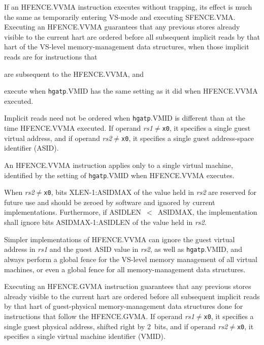 If an HFENCE.VVMA instruction executes without trapping, its effect is much the
same as temporarily entering VS-mode and executing SFENCE.VMA.
Executing an HFENCE.VVMA guarantees that any previous stores already visible
to the current hart are ordered before all subsequent implicit reads by that
hart of the VS-level memory-management data structures, when those implicit
reads are for instructions that
\begin{compactitem}
\item
are subsequent to the HFENCE.VVMA, and
\item
execute when {\tt hgatp}.VMID has the same setting as it did when HFENCE.VVMA
executed.
\end{compactitem}
Implicit reads need not be ordered when {\tt hgatp}.VMID is different than at
the time HFENCE.VVMA executed.
If operand {\em rs1}$\neq${\tt x0}, it specifies a single guest virtual
address, and if operand {\em rs2}$\neq${\tt x0}, it specifies a single guest
address-space identifier
(ASID).

\begin{commentary}
An HFENCE.VVMA instruction applies only to a single virtual machine, identified
by the setting of {\tt hgatp}.VMID when HFENCE.VVMA executes.
\end{commentary}

When {\em rs2}$\neq${\tt x0}, bits XLEN-1:ASIDMAX of the value held in {\em
rs2} are reserved for future use and should be zeroed by software and ignored
by current implementations.
Furthermore, if ASIDLEN~$<$~ASIDMAX, the implementation shall ignore bits
ASIDMAX-1:ASIDLEN of the value held in {\em rs2}.

\begin{commentary}
Simpler implementations of HFENCE.VVMA can ignore the guest virtual address in
{\em rs1} and the guest ASID value in {\em rs2}, as well as {\tt hgatp}.VMID,
and always perform a global fence for the VS-level memory management of all
virtual machines, or even a global fence for all memory-management data
structures.
\end{commentary}

Executing an HFENCE.GVMA instruction guarantees that any previous stores
already visible to the current hart are ordered before all subsequent implicit
reads by that hart of guest-physical memory-management data structures done for instructions
that follow the HFENCE.GVMA.
If operand {\em rs1}$\neq${\tt x0}, it specifies a single guest physical
address, shifted right by 2~bits, and if operand {\em rs2}$\neq${\tt x0}, it
specifies a single virtual machine identifier (VMID).

